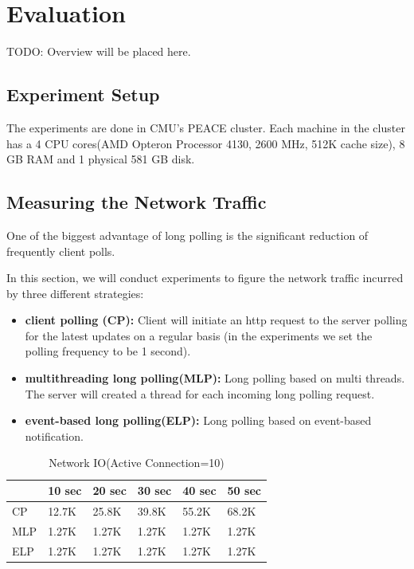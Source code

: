 \section {Evaluation\\}

TODO: Overview will be placed here.

\subsection{Experiment Setup \\}
The experiments are done in CMU's PEACE cluster. Each machine in the cluster has a 4 CPU cores(AMD Opteron Processor 4130, 2600 MHz, 512K cache size), 8 GB RAM and 1 physical 581 GB disk.

\subsection{Measuring the Network Traffic\\}

One of the biggest advantage of long polling is the significant reduction of frequently client polls.

In this section, we will conduct experiments to figure the network traffic incurred by three different strategies:

\begin{itemize}
    \item {\bf client polling (CP): } Client will initiate an http request to the server polling for the latest updates on a regular basis (in the experiments we set the polling frequency to be 1 second).
    \item {\bf multithreading long polling(MLP): } Long polling based on multi threads. The server will created a thread for each incoming long polling request.
    \item {\bf event-based long polling(ELP): }Long polling based on event-based notification.
\end{itemize}

\begin{table}
\centering \caption{\label{tb:traffic} Network IO(Active Connection=10)}
\begin{tabular}{|l|l|l|l|l|l|}
    \hline  & 10 sec & 20 sec & 30 sec & 40 sec & 50 sec \\
    \hline CP & 12.7K & 25.8K & 39.8K & 55.2K & 68.2K \\
    \hline MLP & 1.27K & 1.27K & 1.27K & 1.27K & 1.27K \\
    \hline ELP & 1.27K & 1.27K & 1.27K & 1.27K & 1.27K \\
    \hline
\end{tabular}
\end{table}

